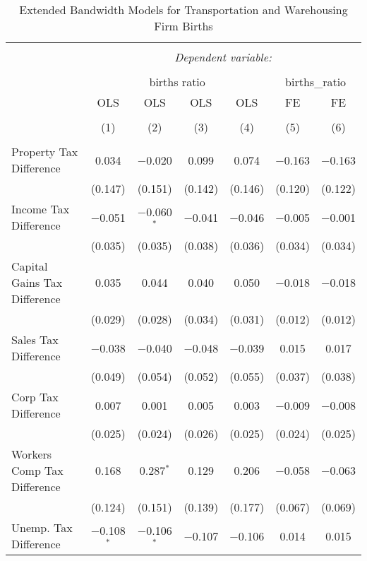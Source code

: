 
\begin{table}[!htbp] \centering 
  \caption{Extended Bandwidth Models for  Transportation and Warehousing Firm Births} 
  \label{48-49eb} 
\begin{tabular}{@{\extracolsep{5pt}}lcccccc} 
\\[-1.8ex]\hline 
\hline \\[-1.8ex] 
 & \multicolumn{6}{c}{\textit{Dependent variable:}} \\ 
\cline{2-7} 
\\[-1.8ex] & \multicolumn{4}{c}{births ratio} & \multicolumn{2}{c}{births\_ratio} \\ 
 & OLS & OLS & OLS & OLS & FE & FE \\ 
\\[-1.8ex] & (1) & (2) & (3) & (4) & (5) & (6)\\ 
\hline \\[-1.8ex] 
 Property Tax Difference & 0.034 & $-$0.020 & 0.099 & 0.074 & $-$0.163 & $-$0.163 \\ 
  & (0.147) & (0.151) & (0.142) & (0.146) & (0.120) & (0.122) \\ 
  Income Tax Difference & $-$0.051 & $-$0.060$^{*}$ & $-$0.041 & $-$0.046 & $-$0.005 & $-$0.001 \\ 
  & (0.035) & (0.035) & (0.038) & (0.036) & (0.034) & (0.034) \\ 
  Capital Gains Tax Difference & 0.035 & 0.044 & 0.040 & 0.050 & $-$0.018 & $-$0.018 \\ 
  & (0.029) & (0.028) & (0.034) & (0.031) & (0.012) & (0.012) \\ 
  Sales Tax Difference & $-$0.038 & $-$0.040 & $-$0.048 & $-$0.039 & 0.015 & 0.017 \\ 
  & (0.049) & (0.054) & (0.052) & (0.055) & (0.037) & (0.038) \\ 
  Corp Tax Difference & 0.007 & 0.001 & 0.005 & 0.003 & $-$0.009 & $-$0.008 \\ 
  & (0.025) & (0.024) & (0.026) & (0.025) & (0.024) & (0.025) \\ 
  Workers Comp Tax Difference & 0.168 & 0.287$^{*}$ & 0.129 & 0.206 & $-$0.058 & $-$0.063 \\ 
  & (0.124) & (0.151) & (0.139) & (0.177) & (0.067) & (0.069) \\ 
  Unemp. Tax Difference & $-$0.108$^{*}$ & $-$0.106$^{*}$ & $-$0.107 & $-$0.106 & 0.014 & 0.015 \\ 

\end{tabular}
\end{table}
